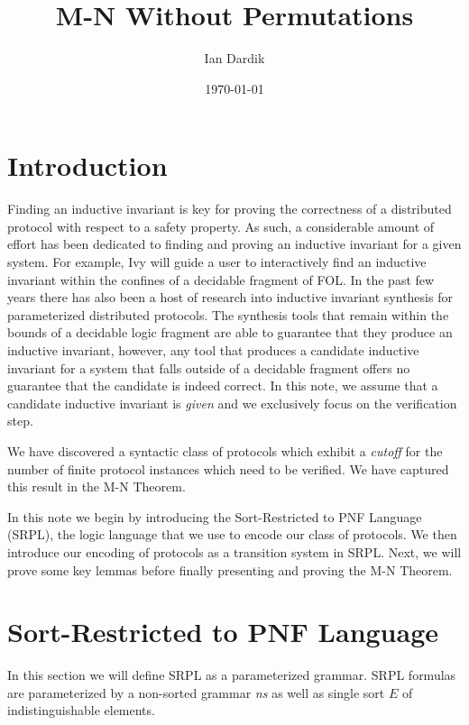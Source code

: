 \documentclass[12pt]{article}
\title{M-N Without Permutations}
\author{Ian Dardik}
\date{\today}
\theoremstyle{definition}
\theoremstyle{remark}
\begin{document}
\maketitle

\section{Introduction}
Finding an inductive invariant is key for proving the correctness of a distributed protocol with respect to a safety property.  As such, a considerable amount of effort has been dedicated to finding and proving an inductive invariant for a given system.  For example, Ivy will guide a user to interactively find an inductive invariant within the confines of a decidable fragment of FOL.  In the past few years there has also been a host of research into inductive invariant synthesis for parameterized distributed protocols.  The synthesis tools that remain within the bounds of a decidable logic fragment are able to guarantee that they produce an inductive invariant, however, any tool that produces a candidate inductive invariant for a system that falls outside of a decidable fragment offers no guarantee that the candidate is indeed correct.  In this note, we assume that a candidate inductive invariant is \textit{given} and we exclusively focus on the verification step.

We have discovered a syntactic class of protocols which exhibit a \textit{cutoff} for the number of finite protocol instances which need to be verified.  We have captured this result in the M-N Theorem.

In this note we begin by introducing the Sort-Restricted to PNF Language (SRPL), the logic language that we use to encode our class of protocols.  We then introduce our encoding of protocols as a transition system in SRPL.  Next, we will prove some key lemmas before finally presenting and proving the M-N Theorem.



\section{Sort-Restricted to PNF Language}

In this section we will define SRPL as a parameterized grammar.  SRPL formulas are parameterized by a non-sorted grammar \textit{ns} as well as single sort $E$ of indistinguishable elements.
\end{document}
